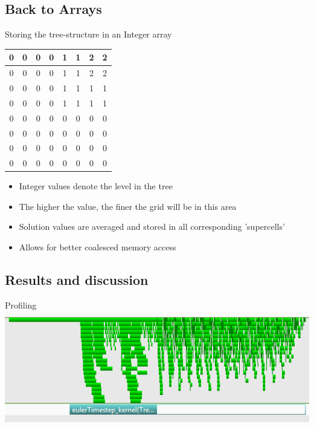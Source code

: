 \documentclass[fleqn,11pt,aspectratio=43]{beamer}
\begin{document}
\subsection{Back to Arrays}
	\begin{frame}{Storing the tree-structure in an Integer array}
		\centering
		\begin{tabular}{ | c | c | c | c || c | c | c | c |}
			\hline
  			0 & 0 & 0 & 0 & 1 & 1 & 2 & 2 \\ \hline
  			0 & 0 & 0 & 0 & 1 & 1 & 2 & 2 \\ \hline
  			0 & 0 & 0 & 0 & 1 & 1 & 1 & 1 \\ \hline
			0 & 0 & 0 & 0 & 1 & 1 & 1 & 1 \\ \hline \hline
  			0 & 0 & 0 & 0 & 0 & 0 & 0 & 0 \\ \hline
  			0 & 0 & 0 & 0 & 0 & 0 & 0 & 0 \\ \hline
  			0 & 0 & 0 & 0 & 0 & 0 & 0 & 0 \\ \hline
  			0 & 0 & 0 & 0 & 0 & 0 & 0 & 0 \\ \hline
		\end{tabular}
		\begin{itemize}
			\item Integer values denote the level in the tree
			\item The higher the value, the finer the grid will be in this area
			\item Solution values are averaged and stored in all corresponding 'supercells'
			\item Allows for better coalesced memory access
		\end{itemize}
	\end{frame}
	
\subsection{Results and discussion}
	\begin{frame}{Profiling}
		\centering
		\includegraphics[width=1\textwidth]{profilingArray.png}
	\end{frame}
	
\end{document}

